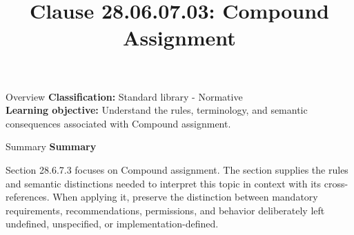 \documentclass[10pt,letterpaper]{article}
\title{Clause 28.06.07.03: Compound Assignment}
\author{}
\date{}
\begin{document}
\maketitle
\begin{CornellOverviewBox}{Overview}
\textbf{Classification:} Standard library - Normative\\[2pt]
\textbf{Learning objective:} Understand the rules, terminology, and semantic consequences associated with Compound assignment.
\end{CornellOverviewBox}\begin{CornellSummaryBox}{Summary}
{\sffamily\bfseries\color{Accent} Summary}\par\vspace{3pt}Section 28.6.7.3 focuses on Compound assignment. The section supplies the rules and semantic distinctions needed to interpret this topic in context with its cross-references. When applying it, preserve the distinction between mandatory requirements, recommendations, permissions, and behavior deliberately left undefined, unspecified, or implementation-defined.
\end{CornellSummaryBox}
\end{document}
